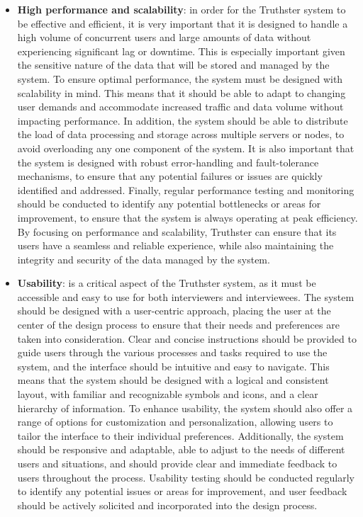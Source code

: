 \documentclass[target=mst,aauheader=]{thud}
\begin{document}
\begin{itemize}

    \item \textbf{High performance and scalability}: in order for the Truthster system to be effective and efficient, it is very important that it is designed to handle a high volume of concurrent users and large amounts of data without experiencing significant lag or downtime. This is especially important given the sensitive nature of the data that will be stored and managed by the system. To ensure optimal performance, the system must be designed with scalability in mind. This means that it should be able to adapt to changing user demands and accommodate increased traffic and data volume without impacting performance. In addition, the system should be able to distribute the load of data processing and storage across multiple servers or nodes, to avoid overloading any one component of the system. It is also important that the system is designed with robust error-handling and fault-tolerance mechanisms, to ensure that any potential failures or issues are quickly identified and addressed. Finally, regular performance testing and monitoring should be conducted to identify any potential bottlenecks or areas for improvement, to ensure that the system is always operating at peak efficiency. By focusing on performance and scalability, Truthster can ensure that its users have a seamless and reliable experience, while also maintaining the integrity and security of the data managed by the system.
    \item \textbf{Usability}: is a critical aspect of the Truthster system, as it must be accessible and easy to use for both interviewers and interviewees. The system should be designed with a user-centric approach, placing the user at the center of the design process to ensure that their needs and preferences are taken into consideration. Clear and concise instructions should be provided to guide users through the various processes and tasks required to use the system, and the interface should be intuitive and easy to navigate. This means that the system should be designed with a logical and consistent layout, with familiar and recognizable symbols and icons, and a clear hierarchy of information. To enhance usability, the system should also offer a range of options for customization and personalization, allowing users to tailor the interface to their individual preferences. Additionally, the system should be responsive and adaptable, able to adjust to the needs of different users and situations, and should provide clear and immediate feedback to users throughout the process. Usability testing should be conducted regularly to identify any potential issues or areas for improvement, and user feedback should be actively solicited and incorporated into the design process.

\end{itemize}
\end{document}
